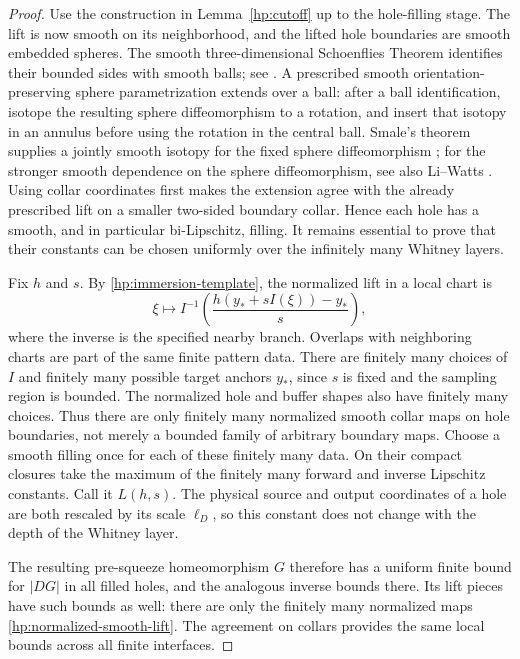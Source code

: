 \documentclass[11pt]{article}
\numberwithin{equation}{section}
\theoremstyle{definition}
\theoremstyle{remark}
\begin{document}
\begin{proof}
Use the construction in Lemma~\ref{hp:cutoff} up to the hole-filling
stage.  The lift is now smooth on its neighborhood, and the lifted
hole boundaries are smooth embedded spheres.  The smooth
three-dimensional Schoenflies Theorem identifies their bounded sides
with smooth balls; see \cite[Section~1.1, Theorem~1.1]{Hatcher2023}.
A prescribed smooth orientation-preserving
sphere parametrization extends over a ball: after a ball
identification, isotope the resulting sphere diffeomorphism to a
rotation, and insert that isotopy in an annulus before using the
rotation in the central ball.  Smale's theorem supplies a jointly
smooth isotopy for the fixed sphere diffeomorphism
\cite[Theorem~6]{Smale1959}; for the stronger smooth dependence on
the sphere diffeomorphism, see also Li--Watts
\cite[Theorem~1.5]{LiWatts2011}.
Using collar coordinates first makes
the extension agree with the already prescribed lift on a smaller
two-sided boundary collar.  Hence each hole has a smooth, and in
particular bi-Lipschitz, filling.  It remains essential to prove that
their constants can be chosen uniformly over the infinitely many
Whitney layers.

Fix $h$ and $s$.  By \eqref{hp:immersion-template}, the normalized
lift in a local chart is
\begin{equation}\label{hp:normalized-smooth-lift}
 \xi\longmapsto
 I^{-1}\!\left(
   \frac{h(y_*+sI(\xi))-y_*}{s}
 \right),
\end{equation}
where the inverse is the specified nearby branch.  Overlaps with
neighboring charts are part of the same finite pattern data.  There
are finitely many choices of $I$ and finitely many possible target
anchors $y_*$, since $s$ is fixed and the sampling region is bounded.
The normalized hole and buffer shapes also have finitely many
choices.  Thus there are only finitely many normalized smooth collar
maps on hole boundaries, not merely a bounded family of arbitrary
boundary maps.  Choose a smooth filling once for each of these
finitely many data.  On their compact closures take the maximum of
the finitely many forward and inverse Lipschitz constants.  Call it
$L(h,s)$.  The physical source and output coordinates of a hole are
both rescaled by its scale $\ell_D$, so this constant does not change
with the depth of the Whitney layer.

The resulting pre-squeeze homeomorphism $G$ therefore has a uniform
finite bound for $|DG|$ in all filled holes, and the analogous
inverse bounds there.  Its lift pieces have such bounds as well:
there are only the finitely many normalized maps
\eqref{hp:normalized-smooth-lift}.  The agreement on collars provides
the same local bounds across all finite interfaces.


\end{proof}
\end{document}
